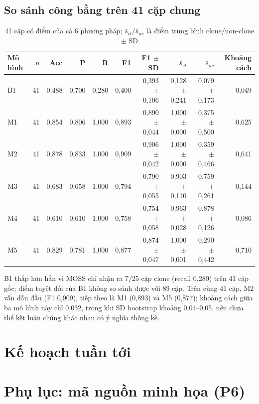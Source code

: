 \documentclass[11pt,a4paper]{article}
\begin{document}
\subsection{So sánh công bằng trên 41 cặp chung}
\begin{table}[htbp]\centering\small
\caption{41 cặp có điểm của cả 6 phương pháp; $\bar{s}_{cl}/\bar{s}_{nc}$ là
điểm trung bình clone/non-clone $\pm$ SD}\label{tab:suite-common}
\setlength{\tabcolsep}{3pt}
\begin{tabular}{lrrrrrrrrr}
\toprule
Mô hình & $n$ & Acc & P & R & F1 & F1 $\pm$ SD & $\bar{s}_{cl}$ & $\bar{s}_{nc}$ & Khoảng cách \\
\midrule
B1 & 41 & 0,488 & 0,700 & 0,280 & 0,400 & 0,393 $\pm$ 0,106 & 0,128 $\pm$ 0,241 & 0,079 $\pm$ 0,173 & 0,049 \\
M1 & 41 & 0,854 & 0,806 & 1,000 & 0,893 & 0,890 $\pm$ 0,044 & 1,000 $\pm$ 0,000 & 0,375 $\pm$ 0,500 & 0,625 \\
M2 & 41 & 0,878 & 0,833 & 1,000 & 0,909 & 0,906 $\pm$ 0,042 & 1,000 $\pm$ 0,000 & 0,359 $\pm$ 0,466 & 0,641 \\
M3 & 41 & 0,683 & 0,658 & 1,000 & 0,794 & 0,790 $\pm$ 0,055 & 0,903 $\pm$ 0,110 & 0,759 $\pm$ 0,261 & 0,144 \\
M4 & 41 & 0,610 & 0,610 & 1,000 & 0,758 & 0,754 $\pm$ 0,058 & 0,963 $\pm$ 0,028 & 0,878 $\pm$ 0,126 & 0,086 \\
M5 & 41 & 0,829 & 0,781 & 1,000 & 0,877 & 0,874 $\pm$ 0,047 & 1,000 $\pm$ 0,001 & 0,290 $\pm$ 0,442 & 0,710 \\
\bottomrule
\end{tabular}
\end{table}

B1 thấp hơn hẳn vì MOSS chỉ nhận ra 7/25 cặp clone (recall 0,280) trên 41 cặp gốc;
điểm tuyệt đối của B1 không so sánh được với 89 cặp. Trên cùng 41 cặp, M2 vẫn
dẫn đầu (F1 0,909), tiếp theo là M1 (0,893) và M5 (0,877); khoảng cách giữa ba
mô hình này chỉ 0,032, trong khi SD bootstrap khoảng 0,04--0,05, nên chưa thể
kết luận chúng khác nhau có ý nghĩa thống kê.

\section{Kế hoạch tuần tới}

\section{Phụ lục: mã nguồn minh họa (P6)}
\end{document}
